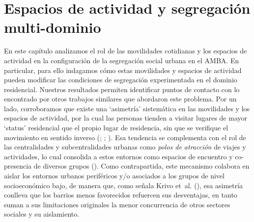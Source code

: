 \documentclass[
  spanish,
  a4paper,%
  chapterprefix=true,%
  DIV=calc,%
  twoside]{scrbook}%
\begin{document}
\section{Espacios de actividad y segregación multi-dominio}\label{mobilities-conclussion}

En este capítulo analizamos el rol de las movilidades cotidianas y los
espacios de actividad en la configuración de la segregación social
urbana en el AMBA. En particular, para ello indagamos cómo estas
movilidades y espacios de actividad pueden modificar las condiciones de
segregación experimentada en el dominio residencial. Nuestros resultados
permiten identificar puntos de contacto con lo encontrado por otros
trabajos similares que abordaron este problema. Por un lado,
corroboramos que existe una `asimetría' sistemática en las movilidades y
los espacios de actividad, por la cual las personas tienden a visitar
lugares de mayor `status' residencial que el propio lugar de residencia,
sin que se verifique el movimiento en sentido inverso (; ; ). Esa tendencia se complementa con el rol de las
centralidades y subcentralidades urbanas como \emph{polos de atracción} de
viajes y actividades, lo cual consolida a estos entornos como espacios
de encuentro y co-presencia de diversos grupos (). Como
contrapartida, este mecanismo colabora en aislar los entornos urbanos
periféricos y/o asociados a los grupos de nivel socioeconómico bajo, de
manera que, como señala Krivo et~al. (), esa asimetría conlleva que los
barrios menos favorecidos refuercen sus desventajas, en tanto suman a
sus limitaciones originales la menor concurrencia de otros sectores
sociales y su aislamiento.
\end{document}
